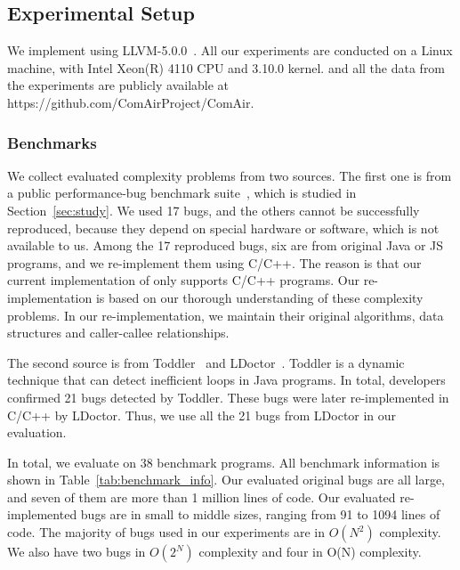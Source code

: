 \subsection{Experimental Setup}

We implement \Tool using LLVM-5.0.0~\cite{llvm}. 
All our experiments are conducted on a Linux machine, 
with Intel Xeon(R) 4110 CPU and 3.10.0 kernel.
\Tool and all the data from the experiments are publicly 
available at https://github.com/ComAirProject/ComAir.





\subsubsection{Benchmarks}

We collect evaluated complexity problems from two sources. 
The first one is
from a public performance-bug benchmark 
suite~\cite{PerfBug,SongOOPSLA2014,ldoctor}, which is
studied in Section~\ref{sec:study}.
We used 17 bugs, and the others cannot be successfully
reproduced, because they depend on special hardware 
or software, which is not available to us. 
Among the 17 reproduced bugs, six are from
original Java or JS programs, 
and we re-implement them using C/C++.
The reason is that our current implementation of \Tool 
only supports C/C++ programs.
Our re-implementation is based on our thorough 
understanding of these complexity problems.
In our re-implementation, we maintain 
their original algorithms, 
data structures and caller-callee relationships. 


The second source is from Toddler~\cite{Alabama} and LDoctor~\cite{ldoctor}. 
Toddler is a dynamic technique that can detect inefficient loops in Java programs.
In total, developers confirmed 21 bugs detected by Toddler. 
These bugs were later re-implemented in C/C++ by LDoctor. 
Thus, we use all the 21 bugs from LDoctor in our evaluation.  


In total, we evaluate \Tool on 38 benchmark programs. 
All benchmark information is shown in Table~\ref{tab:benchmark_info}. 
Our evaluated original bugs are all large, and seven of them 
are more than 1 million lines of code.
Our evaluated re-implemented bugs are in small to middle sizes, 
ranging from 91 to 1094 lines of code. 
The majority of bugs used in our experiments are in $O(N^2)$ complexity. 
We also have two bugs in $O(2^N)$ complexity 
and four in O(N) complexity.



